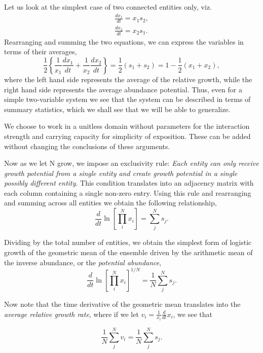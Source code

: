 \documentclass{article}
\begin{document}
Let us look at the simplest case of two connected entities only, viz.
\begin{eqnarray}
\frac{d x_1}{dt} = x_1 s_2, \\
\frac{d x_2}{dt} = x_2 s_1.
\end{eqnarray}
Rearranging and summing the two equations, we can express the variables in terms of their averages,
\begin{equation}
\frac{1}{2} \left\{\frac{1}{x_1}\frac{d x_1}{dt} + \frac{1}{x_2}\frac{d x_2}{dt}\right\} = \frac{1}{2}(s_1 + s_2) = 1 - \frac{1}{2}(x_1 + x_2),
\end{equation}
where the left hand side represents the average of the relative growth, while the right hand side represents the average abundance potential. Thus, even for a simple two-variable system we see that the system can be described in terms of summary statistics, which we shall see that we will be able to generalize.

We choose to work in a unitless domain without parameters for the interaction strength and carrying capacity for simplicity of exposition. These can be added without changing the conclusions of these arguments. 

Now as we let N grow, we impose an exclusivity rule: \textit{Each entity can only receive growth potential from a single entity and create growth potential in a single possibly different entity}. This condition translates into an adjacency matrix with each column containing a single non-zero entry. 
Using this rule and rearranging and summing across all entities we obtain the following relationship,
\begin{equation}
\label{eq:modSIR22}
\frac{d}{dt} \ln \left[ \prod_i^N x_i \right ] = \sum_j^N s_{j}.
\end{equation}

Dividing by the total number of entities, we obtain the simplest form of logistic growth of the geometric mean of the ensemble driven by the arithmetic mean of the inverse abundance, or the \textit{potential abundance}, 
\begin{equation}
\label{eq:modSIR3}
\frac{d}{dt} \ln \left[ \prod_i^N x_i \right ]^{1/N} = \frac{1}{N}\sum_j^N s_j.
\end{equation}

Now note that the time derivative of the geometric mean translates into the \textit{average relative growth rate}, where if we let $v_i=\frac{1}{x_i}\frac{d}{dt}x_i$, we see that

\begin{equation}
\label{eq:modSIR4}
\frac{1}{N}\sum_j^N v_i = \frac{1}{N}\sum_j^N s_j.
\end{equation}
\end{document}
